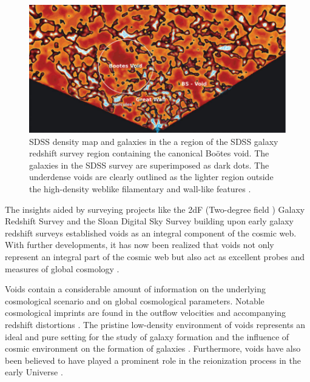 \documentclass[fleqn,usenatbib]{mnras}
\begin{document}
\begin{figure}
	\centering
	\includegraphics[scale=0.37]{sdss_bootes}
	\caption{SDSS density map and galaxies in the a region of the SDSS galaxy redshift survey region containing the canonical Bo\"{o}tes void. The galaxies in the SDSS survey are superimposed as dark dots. The underdense voids are clearly outlined as the lighter region outside the high-density weblike filamentary and wall-like features \citep{van_de_weygaert_voids_2014}.}
	\label{fig:sdss_bootes}
\end{figure}


The insights aided by surveying projects like the 2dF (Two-degree field ) Galaxy Redshift Survey \citep{colless_2df_2001} and the Sloan Digital Sky Survey \citep{tegmark_threedimensional_2004} building upon early galaxy redshift surveys \citep{chincarini_size_1975, gregory_perseuspisces_1978, zeldovich_giant_1982} established voids as an integral component of the cosmic web. With further developments, it has now been realized that voids not only represent an integral part of the cosmic web but also act as excellent probes and measures of global cosmology \citep{van_de_weygaert_voids_2014}. 

Voids contain a considerable amount of information on the underlying cosmological scenario and on global cosmological parameters. Notable cosmological imprints are found in the outflow velocities and accompanying redshift distortions \citep{martel_simulation_1990, dekel_omega_1994, ryden_voids_1996}. The pristine low-density environment of voids represents an ideal and pure setting for the study of galaxy formation and the influence of cosmic environment on the formation of galaxies \citep{kreckel_only_2011, kreckel_void_2012}. Furthermore, voids have also been believed to have played a prominent role in the reionization process in the early Universe \citep{furlanetto_cosmology_2006, morales_reionization_2010}.
\end{document}
